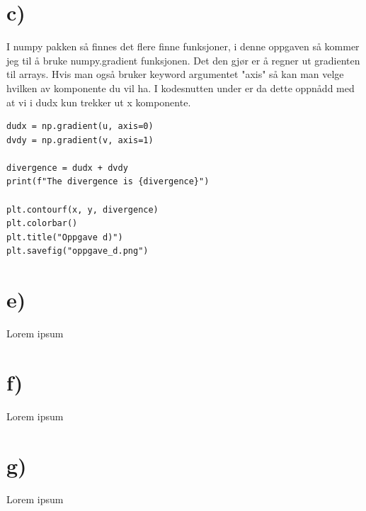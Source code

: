 \documentclass[a4paper,10pt,norsk]{article}
\begin{document}
	\section*{c)}\label{ass:d}
	I numpy pakken så finnes det flere finne funksjoner, i denne oppgaven så kommer jeg til å bruke numpy.gradient funksjonen. Det den gjør er å regner ut gradienten til arrays. Hvis man også bruker keyword argumentet "axis" så kan man velge hvilken av komponente du vil ha. I kodesnutten under er da dette oppnådd med at vi i dudx kun trekker ut x komponente.
	\begin{lstlisting}[caption=Oppgave d]
dudx = np.gradient(u, axis=0)
dvdy = np.gradient(v, axis=1)

divergence = dudx + dvdy
print(f"The divergence is {divergence}")

plt.contourf(x, y, divergence)
plt.colorbar()
plt.title("Oppgave d)")
plt.savefig("oppgave_d.png")
	\end{lstlisting}

	\section*{e)}\label{ass:e}
	Lorem ipsum

	\section*{f)}\label{ass:f}
	Lorem ipsum

	\section*{g)}\label{ass:g}
	Lorem ipsum
\end{document}
